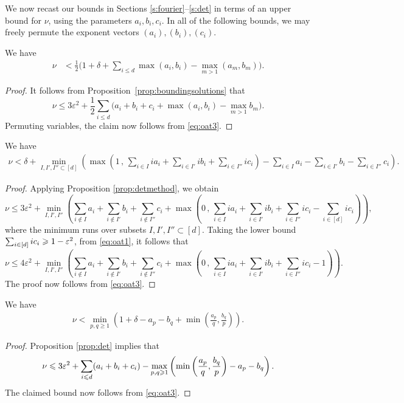 We now recast our bounds in Sections \ref{s:fourier}--\ref{s:det} in terms of
an upper bound for $\nu$, using
the parameters $a_i,b_i,c_i$.
In all of the following bounds, we may freely permute the exponent vectors $(a_i),(b_i),(c_i)$.

\begin{proposition*}
We have
\begin{align*}
\nu & < \frac{1}{2}\Big(1+\delta +\sum_{i\leq d} \max(a_i,b_i) - \max_{m>1}(a_m,b_m)\Big).
\end{align*}
\end{proposition*}
\begin{proof}
It  follows from Proposition~\ref{prop:boundingsolutions} that
$$
\nu \leq 3\varepsilon^2+
\frac{1}{2}\sum_{i\leq d}\Big(a_i+b_i+c_i +\max(a_i,b_i) - \max_{m>1}b_m\Big).
$$
Permuting variables, the claim now follows from \eqref{eq:oat3}.
\end{proof}


\begin{proposition*}
We have
\begin{align*}
\nu < \delta + \min_{I,I',I''\subset [d]} \left(
\max\left( 1 \,,\, \sum_{i\in I} ia_i +\sum_{i\in I'} ib_i + \sum_{i\in I''} ic_i\right) - \sum_{i\in I} a_i -\sum_{i\in I'} b_i - \sum_{i\in I''} c_i\right).
\end{align*}
\end{proposition*}
\begin{proof}
Applying Proposition \ref{prop:detmethod}, we obtain
$$
\nu \leq 3\varepsilon^2+
\min_{I,I',I''}
 \left(  \sum_{i\notin I} a_i +\sum_{i\notin I'} b_i + \sum_{i\notin I''} c_i +
\max\left( 0 \,,\, \sum_{i\in I} ia_i +\sum_{i\in I'} ib_i + \sum_{i\in I''} ic_i-
\sum_{i\in [d]} ic_i
\right)\right) ,
$$
where the minimum runs over subsets
$I,I',I''\subset[d]$. Taking the lower bound
$\sum_{i\in [d]} ic_i\geqslant 1-\varepsilon^2$,
 from \eqref{eq:oat1},
 it follows that
\begin{equation}
\nu
\leq 4\varepsilon^2+
\min_{I,I',I''}
 \left( \sum_{i\notin I} a_i +\sum_{i\notin I'} b_i + \sum_{i\notin I''} c_i+
\max\left( 0 \,,\, \sum_{i\in I} ia_i +\sum_{i\in I'} ib_i + \sum_{i\in I''} ic_i-1\right)\right).\label{eq:Geoalt}
\end{equation}
The proof now follows from \eqref{eq:oat3}.
\end{proof}


\begin{proposition*}
We have
\begin{align*}
\nu < \min_{p,q\ge1} \left( 1+\delta- a_p - b_q +\min\left(\frac{a_p}{q}, \frac{b_q}{p}\right)\right).
\end{align*}
\end{proposition*}
\begin{proof}
Proposition \ref{prop:det} implies
that
$$
\nu\leqslant  3\varepsilon^2+
\sum_{i\leqslant d} (a_i+b_i+c_i)
-\max_{p,q\geqslant 1} \left(\min\left(
\frac{a_p}{q}, \frac{b_q}{p}\right)
-a_p-b_q\right).
$$
The claimed bound now follows from \eqref{eq:oat3}.
\end{proof}


